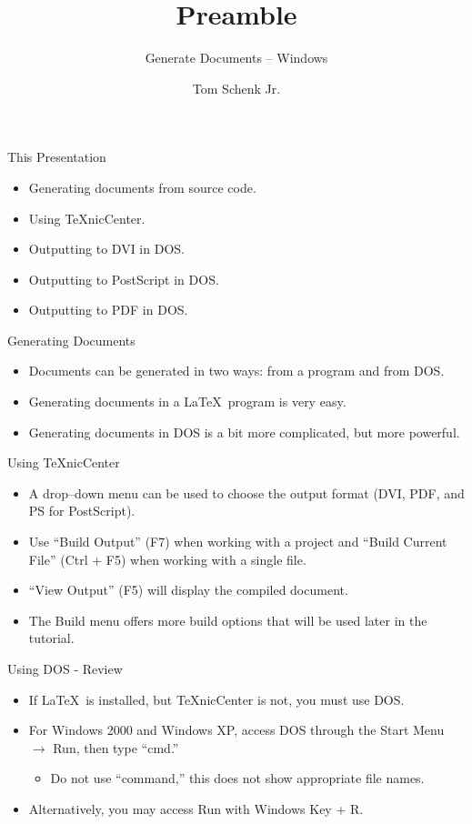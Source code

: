 \documentclass[pdf]{prosper}
\title{Preamble}
\subtitle{Generate Documents -- Windows}
\author{Tom Schenk Jr.}
\begin{document}
\maketitle
\begin{slide}{This Presentation}
	\begin{itemize}
		\item Generating documents from source code.
		\item Using \TeX nicCenter.
		\item Outputting to DVI in DOS.
		\item Outputting to PostScript in DOS.
		\item Outputting to PDF in DOS.
	\end{itemize}
\end{slide}
\begin{slide}{Generating Documents}
	\begin{itemize}
		\item Documents can be generated in two ways: from a program and from DOS.
		\item Generating documents in a \LaTeX\ program is very easy.
		\item Generating documents in DOS is a bit more complicated, but more powerful.
	\end{itemize}
\end{slide}
\begin{slide}{Using TeXnicCenter}
	\begin{itemize}
		\item A drop--down menu can be used to choose the output format (DVI, PDF, and PS for PostScript).
		\item Use ``Build Output'' (F7) when working with a project and ``Build Current File'' (Ctrl + F5) when working with a single file.
		\item ``View Output'' (F5) will display the compiled document.
		\item The Build menu offers more build options that will be used later in the tutorial.
	\end{itemize}
\end{slide}
\begin{slide}{Using DOS - Review}
	\begin{itemize}
		\item If \LaTeX\ is installed, but \TeX nicCenter is not, you must use DOS.
		\item For Windows 2000 and Windows XP, access DOS through the Start Menu $\rightarrow$ Run, then type ``cmd.''
			\begin{itemize}
				\item Do not use ``command,'' this does not show appropriate file names.
			\end{itemize}
		\item Alternatively, you may access Run with Windows Key + R.
	\end{itemize}
\end{slide}
\end{document}
